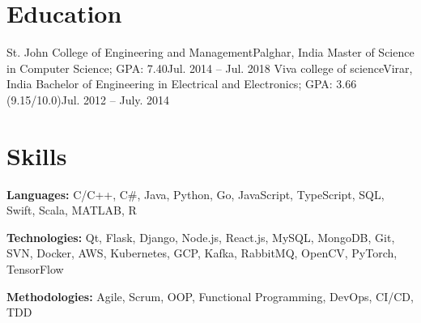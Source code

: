 \documentclass{resume}
\begin{document}
    
  \resumeSubHeadingListEnd


\section{Education}
  \resumeSubHeadingListStart
    \resumeSubheading
      {St. John College of Engineering and Management}{Palghar, India}
      {Master of Science in Computer Science;  GPA: 7.40}{Jul. 2014 -- Jul. 2018}
    \resumeSubheading
      {Viva college of science}{Virar, India}
      {Bachelor of Engineering in Electrical and Electronics;  GPA: 3.66 (9.15/10.0)}{Jul. 2012 -- July. 2014}
  \resumeSubHeadingListEnd




\section{Skills}
  \vspace{2pt}
  \resumeSubHeadingListStart
    \small{\item{
        
        \textbf{Languages:}{ C/C++, C\#, Java, Python, Go, JavaScript, TypeScript, SQL, Swift, Scala, MATLAB, R} \\ \vspace{3pt}
        
        \textbf{Technologies:}{ Qt, Flask, Django, Node.js, React.js, MySQL, MongoDB, Git, SVN, Docker, AWS, Kubernetes, GCP, Kafka, RabbitMQ, OpenCV, PyTorch, TensorFlow} \\ \vspace{3pt}
        
        \textbf{Methodologies:}{ Agile, Scrum, OOP, Functional Programming, DevOps, CI/CD, TDD} \\ \vspace{3pt}
        
    }}
  \resumeSubHeadingListEnd


\end{document}
